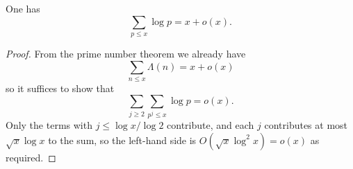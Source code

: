 \begin{theorem}
\label{chebyshev-asymptotic}
\leanok
One has
  $$ \sum_{p \leq x} \log p = x + o(x).$$
\end{theorem}
\begin{proof}
\leanok
From the prime number theorem we already have
  $$ \sum_{n \leq x} \Lambda(n) = x + o(x)$$
  so it suffices to show that
  $$ \sum_{j \geq 2} \sum_{p^j \leq x} \log p = o(x).$$
  Only the terms with $j \leq \log x / \log 2$ contribute, and each $j$ contributes at most
  $\sqrt{x} \log x$ to the sum, so the left-hand side is $O( \sqrt{x} \log^2 x ) = o(x)$ as
  required.
\end{proof}
